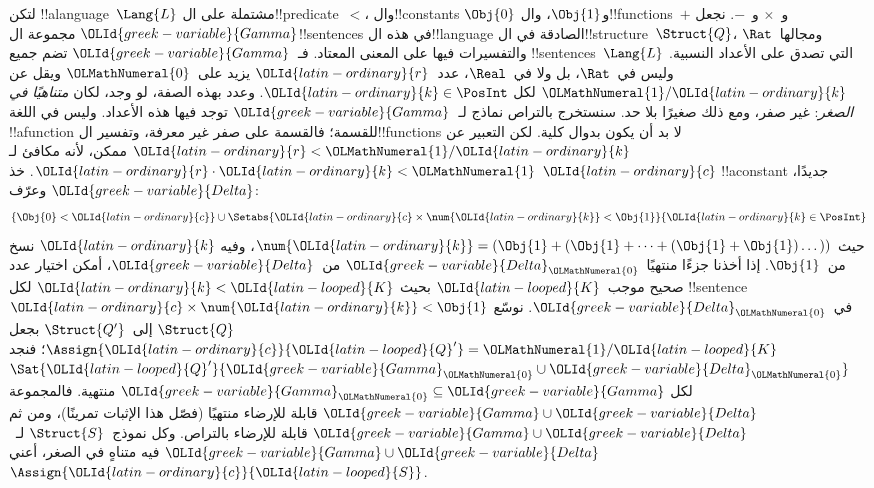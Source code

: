 \documentclass[../../../include/open-logic-section]{subfiles}
\begin{document}
{\begin{ex}
لتكن !!a{language}~$\Lang{L}$ مشتملة على ال!!{predicate}~$<$،
وال!!{constant}s $\Obj{0}$ و$\Obj{1}$، وال!!{function}s~$+$ و~$\times$
و~$-$. نجعل ${\OLId{greek-variable}{Gamma}}$ مجموعة ال!!{sentence}s في هذه ال!!{language}
الصادقة في ال!!{structure}~$\Struct{Q}$، ومجالها~$\Rat$ والتفسيرات
فيها على المعنى المعتاد. فـ~${\OLId{greek-variable}{Gamma}}$ تضم جميع
!!{sentence}s~$\Lang{L}$ التي تصدق على الأعداد النسبية. وليس
في~$\Rat$، بل ولا في~$\Real$، عدد~${\OLId{latin-ordinary}{r}}$ يزيد على~${\OLMathNumeral{0}}$ ويقل عن
${\OLMathNumeral{1}}/{\OLId{latin-ordinary}{k}}$ لكل ${\OLId{latin-ordinary}{k}} \in \PosInt$. وعدد بهذه الصفة، لو وجد، لكان
\emph{متناهيًا في الصغر}: غير صفر، ومع ذلك صغيرًا بلا حد.
سنستخرج بالتراص نماذج لـ~${\OLId{greek-variable}{Gamma}}$ توجد فيها هذه الأعداد.
وليس في اللغة !!a{function} للقسمة؛ فالقسمة على صفر غير معرفة،
وتفسير ال!!{function}s لا بد أن يكون بدوال كلية. لكن التعبير عن
${\OLId{latin-ordinary}{r}} < {\OLMathNumeral{1}}/{\OLId{latin-ordinary}{k}}$ ممكن، لأنه مكافئ لـ${\OLId{latin-ordinary}{r}} \cdot {\OLId{latin-ordinary}{k}} < {\OLMathNumeral{1}}$. خذ ${\OLId{latin-ordinary}{c}}$
!!a{constant} جديدًا، وعرّف ${\OLId{greek-variable}{Delta}}$:
\[
\{\Obj{0} < {\OLId{latin-ordinary}{c}}\}
\cup \Setabs{ {\OLId{latin-ordinary}{c}} \times \num {\OLId{latin-ordinary}{k}} < \Obj{1} }{{\OLId{latin-ordinary}{k}} \in \PosInt}
\]
حيث $\num{{\OLId{latin-ordinary}{k}}} = (\Obj{1} + (\Obj{1} + \dots + (\Obj{1} +
\Obj{1})\dots))$، وفيه ${\OLId{latin-ordinary}{k}}$ نسخ من~$\Obj{1}$. إذا أخذنا جزءًا
منتهيًا~${\OLId{greek-variable}{Delta}}_{\OLMathNumeral{0}}$ من~${\OLId{greek-variable}{Delta}}$، أمكن اختيار عدد صحيح موجب~${\OLId{latin-looped}{K}}$
بحيث ${\OLId{latin-ordinary}{k}} < {\OLId{latin-looped}{K}}$ لكل !!{sentence}~${\OLId{latin-ordinary}{c}} \times \num{{\OLId{latin-ordinary}{k}}} < \Obj{1}$
في~${\OLId{greek-variable}{Delta}}_{\OLMathNumeral{0}}$. نوسّع $\Struct{Q}$ إلى~$\Struct{Q'}$ بجعل
$\Assign{{\OLId{latin-ordinary}{c}}}{{\OLId{latin-looped}{Q}}'} = {\OLMathNumeral{1}}/{\OLId{latin-looped}{K}}$؛ فنجد $\Sat{{\OLId{latin-looped}{Q}}'}{{\OLId{greek-variable}{Gamma}}_{\OLMathNumeral{0}} \cup {\OLId{greek-variable}{Delta}}_{\OLMathNumeral{0}}}$
لكل ${\OLId{greek-variable}{Gamma}}_{\OLMathNumeral{0}} \subseteq {\OLId{greek-variable}{Gamma}}$ منتهية. فالمجموعة ${\OLId{greek-variable}{Gamma}} \cup {\OLId{greek-variable}{Delta}}$
قابلة للإرضاء منتهيًا (فصّل هذا الإثبات تمرينًا)، ومن ثم
${\OLId{greek-variable}{Gamma}} \cup {\OLId{greek-variable}{Delta}}$ قابلة للإرضاء بالتراص. وكل نموذج~$\Struct{S}$
لـ~${\OLId{greek-variable}{Gamma}} \cup {\OLId{greek-variable}{Delta}}$ فيه متناهٍ في الصغر، أعني~$\Assign{{\OLId{latin-ordinary}{c}}}{{\OLId{latin-looped}{S}}}$.
\end{ex}
}{}
\end{document}

